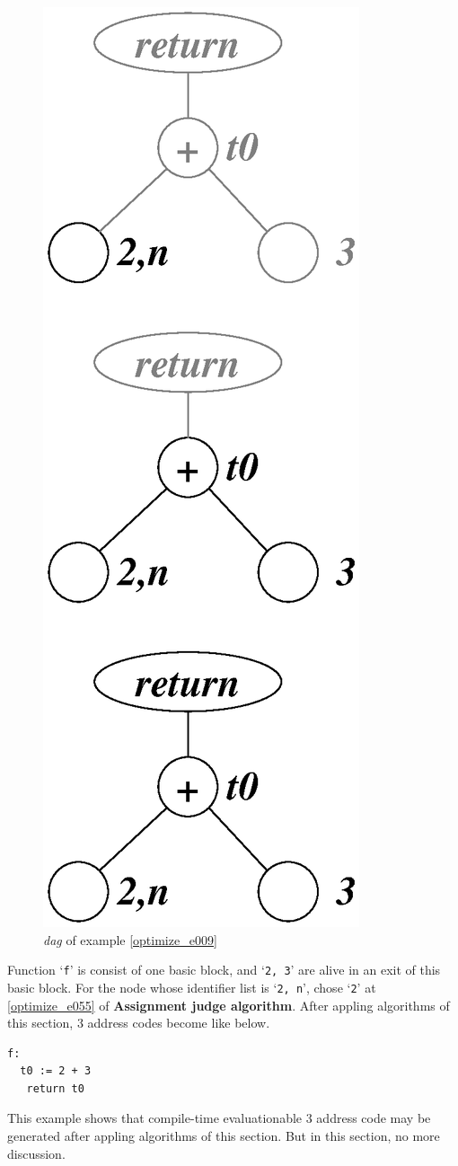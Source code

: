 \begin{Example}
\begin{figure}[htbp]
\begin{center}
\begin{latexonly}
\includegraphics[width=0.392\linewidth,height=1.0\linewidth]{opt002.eps}
\end{latexonly}
\caption{{\em dag} of example \ref{optimize_e009}}
\label{optimize_e010}
\end{center}
\end{figure}
Function `{\tt{f}}' is consist of one basic block, and 
`{\tt{2, 3}}' are alive in an exit of this basic block.
For the node whose identifier list is `{\tt{2, n}}',
chose `{\tt{2}}' at \ref{optimize_e055} of {\bf Assignment judge algorithm}.
After appling algorithms of this section,
3 address codes become like below.
\begin{verbatim}
f:
  t0 := 2 + 3
   return t0
\end{verbatim}
This example shows that
compile-time evaluationable 3 address code may be generated
after appling algorithms of this section. But in this section,
no more discussion.
\end{Example}

